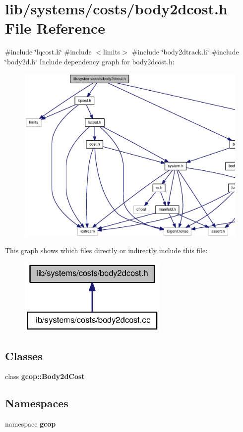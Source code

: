 \section{lib/systems/costs/body2dcost.h \-File \-Reference}
\label{body2dcost_8h}
{\ttfamily \#include \char`\"{}lqcost.\-h\char`\"{}}\*
{\ttfamily \#include $<$limits$>$}\*
{\ttfamily \#include \char`\"{}body2dtrack.\-h\char`\"{}}\*
{\ttfamily \#include \char`\"{}body2d.\-h\char`\"{}}\*
\-Include dependency graph for body2dcost.\-h\-:\nopagebreak
\begin{figure}[H]
\begin{center}
\leavevmode
\includegraphics[width=350pt]{body2dcost_8h__incl}
\end{center}
\end{figure}
\-This graph shows which files directly or indirectly include this file\-:\nopagebreak
\begin{figure}[H]
\begin{center}
\leavevmode
\includegraphics[width=204pt]{body2dcost_8h__dep__incl}
\end{center}
\end{figure}
\subsection*{\-Classes}
\begin{DoxyCompactItemize}
\item 
class {\bf gcop\-::\-Body2d\-Cost}
\end{DoxyCompactItemize}
\subsection*{\-Namespaces}
\begin{DoxyCompactItemize}
\item 
namespace {\bf gcop}
\end{DoxyCompactItemize}

